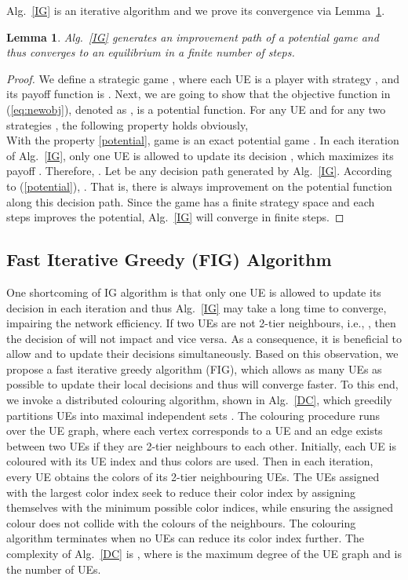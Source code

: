 \documentclass[conference]{IEEEtran}
\newtheorem{lemma}{Lemma}
\begin{document}
Alg.~\ref{IG} is an iterative algorithm and we prove its convergence via Lemma~\ref{lemma1}.
\begin{lemma} 
Alg.~\ref{IG} generates an improvement path of a potential game and thus converges to an equilibrium in a finite number of steps.
\label{lemma1}
\end{lemma}

\begin{proof}
We define a strategic game , where each UE  is a player with strategy , and its payoff function is . Next, we are going to show that the objective function in (\ref{eq:newobj}), denoted as , is a potential function. For any UE  and for any two strategies , the following property holds obviously,
\\
With the property \eqref{potential}, game  is an exact potential game \cite{monderer1996potential}. In each iteration of Alg.~\ref{IG}, only one UE  is allowed to update its decision , which maximizes its payoff . Therefore, . Let  be any decision path generated by Alg.~\ref{IG}. According to (\ref{potential}), . That is, there is always improvement on the potential function along this decision path. Since the game has a finite strategy space and each steps improves the potential, Alg.~\ref{IG} will converge in finite steps.
\end{proof}


\subsection{Fast Iterative Greedy (FIG) Algorithm }

One shortcoming of IG algorithm is that only one UE is allowed to update its decision in each iteration and thus Alg.~\ref{IG} may take a long time to converge, impairing the network efficiency. If two UEs  are not 2-tier neighbours, i.e., , then the decision of  will not impact  and vice versa. As a consequence, it is beneficial to allow  and  to update their decisions simultaneously. Based on this observation, we propose a fast iterative greedy algorithm (FIG), which allows as many UEs as possible to update their local decisions and thus will converge faster. To this end, we invoke a distributed colouring algorithm, shown in Alg.~\ref{DC}, which greedily partitions UEs into maximal independent sets \cite{barenboim2013distributed}. The colouring procedure runs over the UE graph, where each vertex corresponds to a UE and an edge exists between two UEs if they are 2-tier neighbours to each other. Initially, each UE is coloured with its UE index and thus  colors are used. Then in each iteration, every UE obtains the colors of its 2-tier neighbouring UEs. The UEs assigned with the largest color index seek to reduce their color index by assigning themselves with the minimum possible color indices, while ensuring the assigned colour does not collide with the colours of the neighbours. The colouring algorithm terminates when no UEs can reduce its color index further. The complexity of Alg.~\ref{DC} is , where  is the maximum degree of the UE graph and  is the number of UEs.
\end{document}

